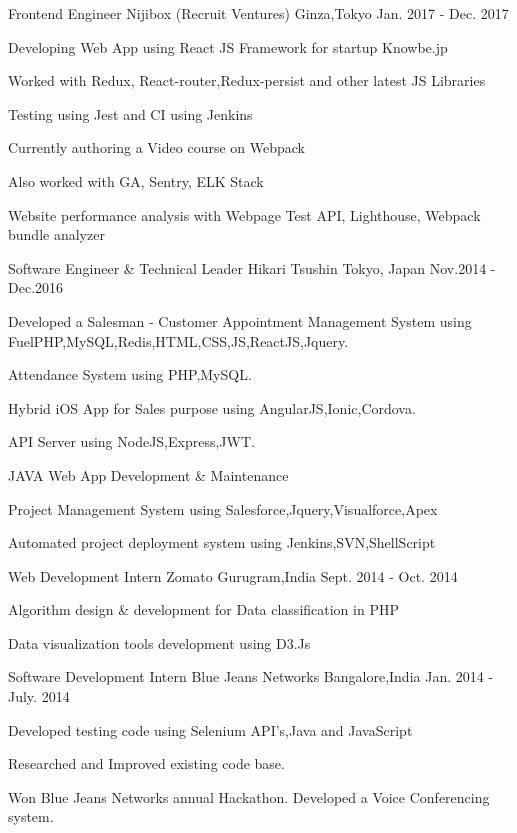 \begin{cventries}
  \cventry
    { Frontend Engineer}
    {Nijibox (Recruit Ventures)}
    {Ginza,Tokyo}
    {Jan. 2017 - Dec. 2017}
    {
      \begin{cvitems}
        \item {Developing Web App using React JS Framework for startup Knowbe.jp}
        \item {Worked with Redux, React-router,Redux-persist and other latest JS Libraries}
        \item {Testing using Jest and CI using Jenkins}
        \item {Currently authoring a Video course on Webpack}
        \item {Also worked with GA, Sentry, ELK Stack}
        \item {Website performance analysis with Webpage Test API, Lighthouse, Webpack bundle analyzer}
      \end{cvitems}
    }
  \cventry
    {Software Engineer \& Technical Leader}
    {Hikari Tsushin}
    {Tokyo, Japan}
    {Nov.2014 - Dec.2016}
    {
      \begin{cvitems}
        \item {Developed a Salesman - Customer Appointment Management System using FuelPHP,MySQL,Redis,HTML,CSS,JS,ReactJS,Jquery.}
        \item {Attendance System using PHP,MySQL.}
        \item {Hybrid iOS App for Sales purpose using AngularJS,Ionic,Cordova.}
        \item {API  Server using NodeJS,Express,JWT.}
        \item {JAVA Web App Development \& Maintenance}
        \item {Project Management System using Salesforce,Jquery,Visualforce,Apex}
        \item {Automated project deployment system using Jenkins,SVN,ShellScript}
      \end{cvitems}
    }
  \cventry
    {Web Development Intern}
    {Zomato}
    {Gurugram,India}
    {Sept. 2014 - Oct. 2014}
    {
      \begin{cvitems}
        \item {Algorithm design \& development for Data classification in PHP}
        \item {Data visualization tools development using D3.Js}
      \end{cvitems}
    }
  \cventry
    {Software Development Intern}
    {Blue Jeans Networks}
    {Bangalore,India}
    {Jan. 2014 - July. 2014}
    {
      \begin{cvitems}
        \item {Developed testing code using Selenium API’s,Java and JavaScript}
        \item {Researched and Improved existing code base.}
        \item {Won Blue Jeans Networks annual Hackathon. Developed a Voice Conferencing system.}
      \end{cvitems} 
    }   
\end{cventries}
